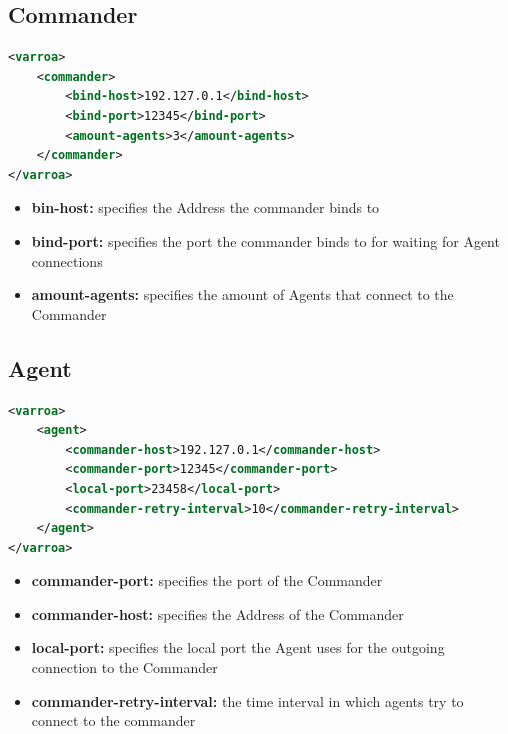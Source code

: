 \subsection{Commander}
\begin{lstlisting}[caption={Commander XML configuration}, captionpos=b, label={lst:commanderConfig}, language=XML]
<varroa>
    <commander>
		<bind-host>192.127.0.1</bind-host>
        <bind-port>12345</bind-port>
        <amount-agents>3</amount-agents>
    </commander>
</varroa>
\end{lstlisting}
\begin{itemize}
	\item \textbf{bin-host:} specifies the Address the commander binds to
	\item \textbf{bind-port:} specifies the port the commander binds to for waiting for Agent connections
	\item \textbf{amount-agents:} specifies the amount of Agents that connect to the Commander
\end{itemize}

\subsection{Agent}
\begin{lstlisting}[caption={Agent XML configuration}, captionpos=b, label={lst:agentConfig}, language=XML]
<varroa>
    <agent>
		<commander-host>192.127.0.1</commander-host>
        <commander-port>12345</commander-port>
        <local-port>23458</local-port>
		<commander-retry-interval>10</commander-retry-interval>
    </agent>
</varroa>
\end{lstlisting}
\begin{itemize}
	\item \textbf{commander-port:} specifies the port of the Commander
	\item \textbf{commander-host:} specifies the Address of the Commander
	\item \textbf{local-port:} specifies the local port the Agent uses for the outgoing connection to the Commander %
	\item \textbf{commander-retry-interval:} the time interval in which agents try to connect to the commander
\end{itemize}
